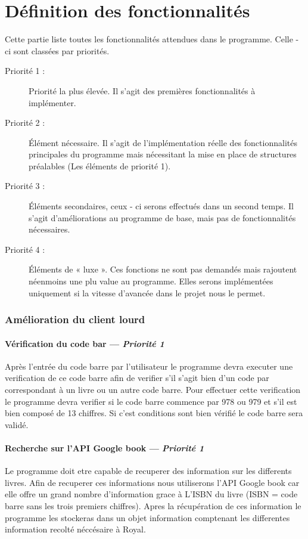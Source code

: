 \part{Définition des fonctionnalités}
Cette partie liste toutes les fonctionnalités attendues dans le programme. Celle - ci sont classées par priorités.

\begin{description}
\item [Priorité 1 :]
	Priorité la plus élevée. Il s'agit des premières fonctionnalités à implémenter.

\item [Priorité 2 :]
	Élément nécessaire. Il s'agit de l'implémentation réelle des fonctionnalités principales du programme mais nécessitant la mise en place de structures préalables (Les éléments de priorité 1). 

\item [Priorité 3 :]
	Éléments secondaires, ceux - ci serons effectués dans un second temps. Il s'agit d'améliorations au programme de base, mais pas de fonctionnalités nécessaires.  

\item [Priorité 4 :]
	Éléments de « luxe ». Ces fonctions ne sont pas demandés mais rajoutent néenmoins une plu value au programme. Elles serons implémentées uniquement si la vitesse d'avancée dans le projet nous le permet.
\end{description}


\section{Amélioration du client lourd}

\subsection[Vérification du code bar]{Vérification du code bar — \emph{Priorité 1}}
Après l'entrée du code barre par l'utilisateur le programme devra executer une verification de ce code barre afin de verifier s'il s'agit bien d'un code par correspondant à un livre ou un autre code barre. Pour effectuer cette verification le programme devra verifier si le code barre commence par 978 ou 979 et s'il est bien composé de 13 chiffres. Si c'est conditions sont bien vérifié le code barre sera validé. 

\subsection[Recherche sur l'API Google book]{Recherche sur l'API Google book — \emph{Priorité 1}}
Le programme doit etre capable de recuperer des information sur les differents livres. Afin de recuperer ces informations nous utiliserons l'API Google book car elle offre un grand nombre d'information grace à L'ISBN du livre (ISBN = code barre sans les trois premiers chiffres). Apres la récupération de ces information le programme les stockeras dans un objet information comptenant les differentes information recolté néccésaire à Royal.  

